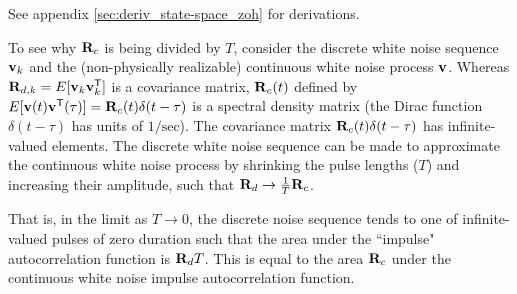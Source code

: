 See appendix \ref{sec:deriv_state-space_zoh} for derivations.

To see why $\mathbf{R}_c$ is being divided by $T$, consider the discrete white
noise sequence $\mathbf{v}_k$ and the (non-physically realizable) continuous white
noise process $\mathbf{v}$. Whereas $\mathbf{R}_{d,k} = E[\mathbf{v}_k \mathbf{v}_k^\mathsf{T}]$ is a
covariance matrix, $\mathbf{R}_c(t)$ defined by
$E[\mathbf{v}(t) \mathbf{v}^\mathsf{T}(\tau)] = \mathbf{R}_c(t)\delta(t - \tau)$ is a spectral
density matrix (the Dirac function $\delta(t - \tau)$ has units of
$1/\text{sec}$). The covariance matrix $\mathbf{R}_c(t)\delta(t - \tau)$ has
infinite-valued elements. The discrete white noise sequence can be made to
approximate the continuous white noise process by shrinking the pulse lengths
($T$) and increasing their amplitude, such that
$\mathbf{R}_d \rightarrow \frac{1}{T}\mathbf{R}_c$.

That is, in the limit as $T \rightarrow 0$, the discrete noise sequence tends to
one of infinite-valued pulses of zero duration such that the area under the
``impulse" autocorrelation function is $\mathbf{R}_d T$. This is equal to the area
$\mathbf{R}_c$ under the continuous white noise impulse autocorrelation function.
